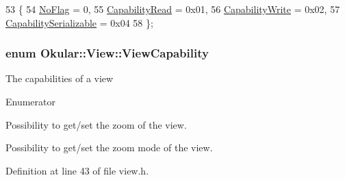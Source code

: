 \begin{DoxyCode}
53         \{
54             \hyperlink{classOkular_1_1View_a8552668497a612628f53b5010df7a45ead39bbacee7b7b4f74d91ed1079922353}{NoFlag} = 0,
55             \hyperlink{classOkular_1_1View_a8552668497a612628f53b5010df7a45ea129d96c4ba7ee8cc9bf91a544d07bcd3}{CapabilityRead} = 0x01,      
56             \hyperlink{classOkular_1_1View_a8552668497a612628f53b5010df7a45ea8d7008cfbe58531381430014358fceb3}{CapabilityWrite} = 0x02,     
57             \hyperlink{classOkular_1_1View_a8552668497a612628f53b5010df7a45eac0b7ffc919ca2416425d9b81b7fef5d9}{CapabilitySerializable} = 0x04  
58         \};
\end{DoxyCode}
\hypertarget{classOkular_1_1View_ad95d365554715eb1eabb79350f51b294}{
\subsubsection[{View\+Capability}]{\setlength{\rightskip}{0pt plus 5cm}enum {\bf Okular\+::\+View\+::\+View\+Capability}}}\label{classOkular_1_1View_ad95d365554715eb1eabb79350f51b294}
The capabilities of a view \begin{Desc}
\item[Enumerator]\par
\begin{description}
\item[{\em 
\hypertarget{classOkular_1_1View_ad95d365554715eb1eabb79350f51b294a3fa37aa9737e4a0f9753aa398c30f667}{Zoom}\label{classOkular_1_1View_ad95d365554715eb1eabb79350f51b294a3fa37aa9737e4a0f9753aa398c30f667}
}]Possibility to get/set the zoom of the view. \item[{\em 
\hypertarget{classOkular_1_1View_ad95d365554715eb1eabb79350f51b294a2621c21053805b1e2f71fdeb069f9c35}{Zoom\+Modality}\label{classOkular_1_1View_ad95d365554715eb1eabb79350f51b294a2621c21053805b1e2f71fdeb069f9c35}
}]Possibility to get/set the zoom mode of the view. \end{description}
\end{Desc}


Definition at line 43 of file view.\+h.


